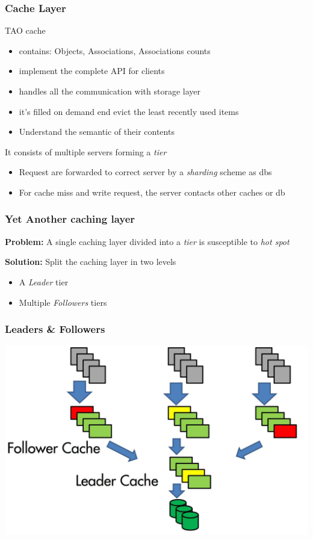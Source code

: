 \begin{frame}[c]\frametitle{Cache Layer}
    TAO cache 
    \begin{itemize}
    	\item contains: Objects, Associations, Associations counts
    	\item implement the complete API for clients
    	\item handles all the communication with storage layer
    	\item it's filled on demand end evict the least recently used items
    	\item Understand the semantic of their contents
    \end{itemize}

    It consists of multiple servers forming a \emph{tier}
    \begin{itemize}
    	\item Request are forwarded to correct server by a \emph{sharding} scheme as dbs
    	\item For cache miss and write request, the server contacts other caches or db
    \end{itemize}
    
\end{frame}
\begin{frame}[c]\frametitle{Yet Another caching layer}
	\textbf{Problem: }A single caching layer divided into a \emph{tier} is susceptible to \emph{hot spot}

	\textbf{Solution: }Split the caching layer in two levels
	\onslide<2->\begin{itemize}
		\item A \emph{Leader} tier
		\item Multiple \emph{Followers}	tiers
	\end{itemize}
\end{frame}

\begin{frame}[c]\frametitle{Leaders \& Followers}
   	\includegraphics[width=\textwidth]{figs/followers_leader.jpeg}
\end{frame}

